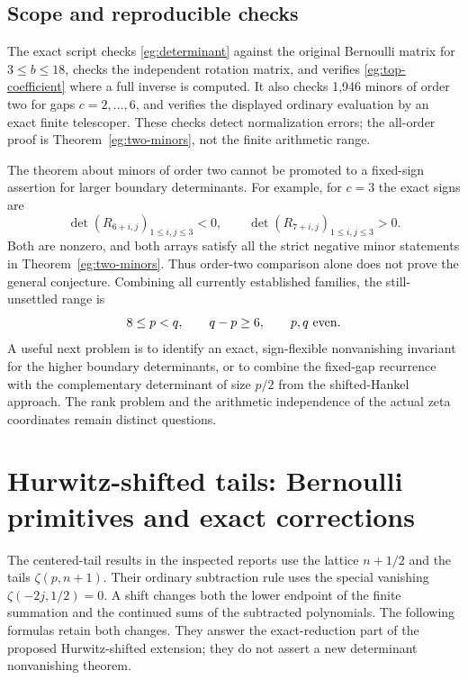\documentclass[11pt]{article}
\theoremstyle{definition}
\theoremstyle{remark}
\numberwithin{equation}{section}
\begin{document}
\subsection{Scope and reproducible checks}

The exact script checks \eqref{eg:determinant} against the original
Bernoulli matrix for $3\le b\le18$, checks the independent rotation
matrix, and verifies \eqref{eg:top-coefficient} where a full inverse
is computed. It also checks 1,946 minors of order two for gaps
$c=2,\ldots,6$, and verifies the displayed ordinary evaluation by
an exact finite telescoper. These checks detect normalization errors;
the all-order proof is Theorem~\ref{eg:two-minors}, not the finite
arithmetic range.

The theorem about minors of order two cannot be promoted to a
fixed-sign assertion for larger boundary determinants. For example,
for $c=3$ the exact signs are
\[
 \det(R_{6+i,j})_{1\le i,j\le3}<0,\qquad
 \det(R_{7+i,j})_{1\le i,j\le3}>0.
\]
Both are nonzero, and both arrays satisfy all the strict negative
minor statements in Theorem~\ref{eg:two-minors}. Thus order-two
comparison alone does not prove the general conjecture. Combining
all currently established families, the still-unsettled range is
\[
             8\le p<q,\qquad q-p\ge6,
             \qquad p,q\ \hbox{even}.
\]
A useful next problem is to identify an exact, sign-flexible
nonvanishing invariant for the higher boundary determinants, or to
combine the fixed-gap recurrence with the complementary determinant
of size $p/2$ from the shifted-Hankel approach. The rank problem and
the arithmetic independence of the actual zeta coordinates remain
distinct questions.


\section{Hurwitz-shifted tails: Bernoulli primitives and exact corrections}
\label{sh:section}

The centered-tail results in the inspected reports use the lattice
$n+1/2$ and the tails $\zeta(p,n+1)$.  Their ordinary subtraction rule
uses the special vanishing $\zeta(-2j,1/2)=0$.  A shift changes both
the lower endpoint of the finite summation and the continued sums of
the subtracted polynomials.  The following formulas retain both changes.
They answer the exact-reduction part of the proposed Hurwitz-shifted
extension; they do not assert a new determinant nonvanishing theorem.
\end{document}
